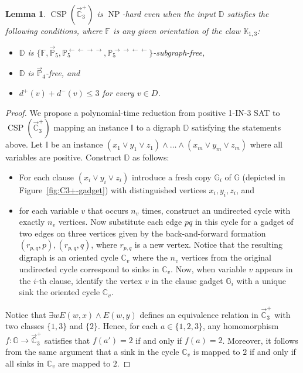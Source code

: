 \documentclass{article}
\newtheorem{lemma}[theorem]{Lemma}
\theoremstyle{definition}
\theoremstyle{remark}
\DeclareMathOperator{\NP}{NP}
\DeclareMathOperator{\CSP}{CSP}
\newcommand{\bC}{{\mathbb C}}
\newcommand{\bD}{{\mathbb D}}
\newcommand{\bF}{{\mathbb F}}
\newcommand{\bG}{{\mathbb G}}
\newcommand{\bI}{{\mathbb I}}
\newcommand{\bK}{{\mathbb K}}
\newcommand{\bP}{{\mathbb P}}
\begin{document}
\begin{lemma}\label{lem:C3+-P4-free}
    $\CSP(\vec{\bC}_3^+)$ is $\NP$-hard even when the input
    $\bD$ satisfies the following conditions, where $\bF$ is any given orientation of the claw $\bK_{1,3}$:
    \begin{itemize}
        \item $\bD$ is $\{\bF,\vec{\bP}_5,\bP_5^{\leftarrow\leftarrow\to\to},\bP_5^{\to\to\leftarrow\leftarrow}\}$-subgraph-free,
        \item $\bD$ is $\vec{\bP}_4$-free, and
        \item $d^+(v) + d^-(v) \le 3$ for every $v\in D$.
    \end{itemize}
\end{lemma}
\begin{proof}
We propose a polynomial-time reduction from positive 1-IN-3 SAT to $\CSP(\vec{\bC}_3^+)$
mapping an instance $\bI$ to a digraph $\bD$ satisfying the statements above.
Let $\bI$ be an instance $(x_1\lor y_1 \lor z_1)\land \dots \land (x_m \lor y_m \lor z_m)$
   where all variables are positive. Construct $\bD$ as follows:
   \begin{itemize}
       \item For each clause $(x_i\lor y_i \lor z_i)$ introduce  a fresh copy $\bG_i$ of $\bG$
       (depicted in Figure~\ref{fig:C3+-gadget}) with distinguished vertices $x_i,y_i,z_i$, and
       \item for each variable $v$ that occurs $n_v$ times, construct an undirected cycle with exactly
       $n_v$ vertices. Now substitute each edge $pq$ in this cycle for a gadget of two edges on
       three vertices given by the back-and-forward formation $(r_{p,q},p),(r_{p,q},q)$, where $r_{p,q}$ is a new vertex. 
       Notice that the resulting digraph is an oriented cycle $\bC_v$ where the $n_v$ vertices from the original
       undirected cycle correspond to sinks in $\bC_v$.
       Now, when variable $v$ appears in the $i$-th clause, identify the vertex $v$ in the clause gadget $\bG_i$ with a unique sink  
       the oriented cycle $\bC_v$.
   \end{itemize}
   Notice that $\exists w E(w,x) \wedge E(w,y)$ defines an equivalence relation in $\vec{\bC}_3^+$
   with two classes $\{1,3\}$ and $\{2\}$. Hence, for each $a\in\{1,2,3\}$, any homomorphism $f\colon
   \bG\to \vec{\bC}_3^+$ satisfies that $f(a') = 2$ if and only if $f(a) = 2$. Moreover, it follows from 
   the same argument that a sink in the cycle $\bC_v$ is mapped to $2$ if and only if all sinks in $\bC_v$ are mapped to $2$.

\end{proof}
\end{document}
